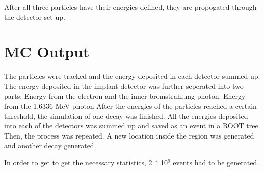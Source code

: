 After all three particles have their energies defined, they are propogated through the detector set up.

\section{MC Output}
The particles were tracked and the energy deposited in each detector summed up.
The energy deposited in the implant detector was further seperated into two parts:
Energy from the  electron and the inner bremstrahlung photon.
Energy from the 1.6336 MeV photon
After the energies of the particles reached a certain threshold, the simulation of one decay was finished.
All the energies deposited into each of the detectors was summed up and saved as an event in a ROOT tree.
Then, the process was repeated.
A new location inside the region was generated and another decay generated.

In order to get to get the necessary statistics, 2 * 10$^{9}$ events had to be generated. 


